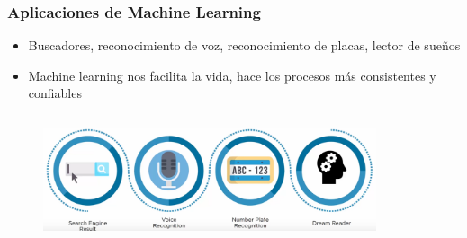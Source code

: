 \documentclass[10pt]{beamer}
\begin{document}
\begin{frame}
\frametitle{Aplicaciones de Machine Learning}
\begin{beamerboxesrounded}[upper=uppercolor, lower=lowercolor, shadow=true]{} 

\begin{itemize}
 \item Buscadores, reconocimiento de voz, reconocimiento de placas, lector de sue\~nos
 \item Machine learning nos facilita la vida, hace los procesos m\'as consistentes y confiables

\end{itemize}
\end{beamerboxesrounded}

\begin{columns}

\hspace{5mm}
\hspace{5mm}
\begin{column}{\textwidth}
 \begin{figure}
 \includegraphics[scale=0.2]{./Figures/aplications.png} 
 \end{figure}
\end{column}%

\begin{column}{.33\textwidth}
 \begin{figure}
 \end{figure}  
\end{column}%

\end{columns}

\end{frame}
\end{document}
